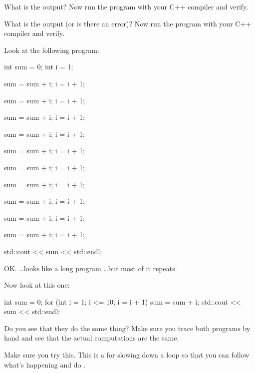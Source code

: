 
What is the output? Now run the program with your C++ compiler and
verify.

What is the output (or is there an error)? Now run the program with your
C++ compiler and verify.

\newpage{}

Look at the following program:
\begin{console}
int sum = 0;
int i = 1;

sum = sum + i;
i = i + 1;

sum = sum + i;
i = i + 1;

sum = sum + i;
i = i + 1;

sum = sum + i;
i = i + 1;

sum = sum + i;
i = i + 1;

sum = sum + i;
i = i + 1;

sum = sum + i;
i = i + 1;

sum = sum + i;
i = i + 1;

sum = sum + i;
i = i + 1;

sum = sum + i;
i = i + 1;

std::cout << sum << std::endl;
\end{console}

OK. \ldots looks like a long program \ldots but most of it repeats.

Now look at this one:
\begin{console}
int sum = 0;
for (int i = 1; i <= 10; i = i + 1)
{   
    sum = sum + i;
}
std::cout << sum << std::endl;
\end{console}

Do you see that they do the same thing? Make sure you trace both
programs by hand and see that the actual computations are the same.


Make sure you try this. This is a  for
slowing down a loop so that you can follow what's
happening and do .

